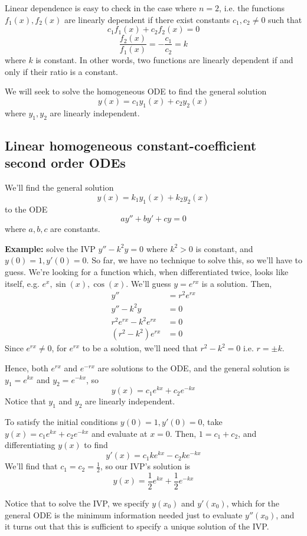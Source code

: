 \documentclass[11pt]{article}
\newcommand{\example}{\textbf{Example: }}
\begin{document}
	Linear dependence is easy to check in the case where $n=2$, i.e. the functions $f_1(x), f_2(x)$ are linearly dependent if there exist constants $c_1, c_2 \neq 0$ such that
		$$ c_1 f_1(x) + c_2 f_2(x) = 0 $$
		$$ \frac{f_2(x)}{f_1 (x)} = - \frac{c_1}{c_2} = k $$
	where $k$ is constant. In other words, two functions are linearly dependent if and only if their ratio is a constant.

	We will seek to solve the homogeneous ODE to find the general solution
		$$ y(x) = c_1 y_1 (x) + c_2 y_2 (x) $$
	where $y_1, y_2$ are linearly independent.

\subsection{Linear homogeneous constant-coefficient second order ODEs}
	We'll find the general solution
		$$ y(x) = k_1 y_1 (x) + k_2 y_2 (x) $$
	to the ODE
		$$ a y'' + b y ' + cy = 0 $$
	where $a,b,c$ are constants.

	\example solve the IVP $y'' - k^2 y = 0$ where $k^2 > 0$ is constant, and $y(0) = 1, y'(0) = 0$. So far, we have no technique to solve this, so we'll have to guess. We're looking for a function which, when differentiated twice, looks like itself, e.g. $e^x, \sin(x), \cos(x)$. We'll guess $y = e^{rx}$ is a solution. Then,
		\begin{align*}
			y'' &= r^2 e^{rx} \\
			y'' - k^2 y &= 0 \\
			r^2 e^{rx} - k^2 e^{rx} &= 0 \\
			(r^2 - k^2) e^{rx} &= 0
		\end{align*}
	Since $e^{rx} \neq 0$, for $e^{rx}$ to be a solution, we'll need that $r^2 - k^2 = 0$ i.e. $r = \pm k$.

	Hence, both $e^{rx}$ and $e^{-rx}$ are solutions to the ODE, and the general solution is $y_1 = e^{kx}$ and $y_2 = e^{-kx}$, so
		$$ y(x) = c_1 e^{kx} + c_2 e^{-kx} $$
	Notice that $y_1$ and $y_2$ are linearly independent.

	To satisfy the initial conditions $y(0) = 1, y'(0) = 0$, take $y(x) = c_1 e^{kx} + c_2 e^{-kx}$ and evaluate at $x = 0$. Then, $1 = c_1 + c_2$, and differentiating $y(x)$ to find
		$$ y'(x) = c_1 k e^{kx} - c_2 k e^{-kx} $$
	We'll find that $c_1 = c_2 = \frac{1}{2}$, so our IVP's solution is
		$$ y(x) = \frac{1}{2} e^{kx} + \frac{1}{2} e^{-kx} $$

	Notice that to solve the IVP, we specify $y(x_0)$ and $y'(x_0)$, which for the general ODE is the minimum information needed just to evaluate $y''(x_0)$, and it turns out that this is sufficient to specify a unique solution of the IVP.
\end{document}
